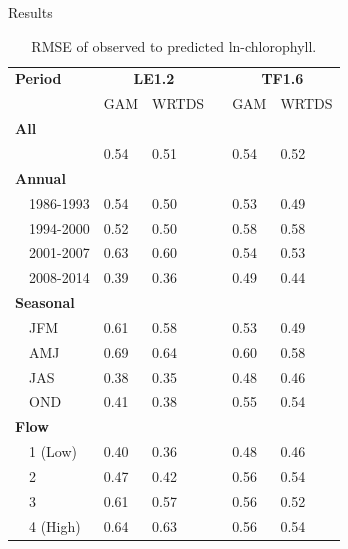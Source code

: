 \documentclass[serif]{beamer}\usepackage[]{graphicx}\usepackage[]{color}
\begin{document}
\begin{frame}[shrink]{Results}
\begin{table}[!tbp]
\caption{RMSE of observed to predicted ln-chlorophyll.\label{tab:perftoobs}} 
\begin{center}
\begin{tabular}{lllcll}
\hline\hline
\multicolumn{1}{l}{\bfseries Period}&\multicolumn{2}{c}{\bfseries LE1.2}&\multicolumn{1}{c}{\bfseries }&\multicolumn{2}{c}{\bfseries TF1.6}\tabularnewline
\cline{2-3} \cline{5-6}
\multicolumn{1}{l}{}&\multicolumn{1}{c}{GAM}&\multicolumn{1}{c}{WRTDS}&\multicolumn{1}{c}{}&\multicolumn{1}{c}{GAM}&\multicolumn{1}{c}{WRTDS}\tabularnewline
\hline
{\bfseries All}&&&&&\tabularnewline
~~&0.54&0.51&&0.54&0.52\tabularnewline
\hline
{\bfseries Annual}&&&&&\tabularnewline
~~1986-1993&0.54&0.50&&0.53&0.49\tabularnewline
~~1994-2000&0.52&0.50&&0.58&0.58\tabularnewline
~~2001-2007&0.63&0.60&&0.54&0.53\tabularnewline
~~2008-2014&0.39&0.36&&0.49&0.44\tabularnewline
\hline
{\bfseries Seasonal}&&&&&\tabularnewline
~~JFM&0.61&0.58&&0.53&0.49\tabularnewline
~~AMJ&0.69&0.64&&0.60&0.58\tabularnewline
~~JAS&0.38&0.35&&0.48&0.46\tabularnewline
~~OND&0.41&0.38&&0.55&0.54\tabularnewline
\hline
{\bfseries Flow}&&&&&\tabularnewline
~~1 (Low)&0.40&0.36&&0.48&0.46\tabularnewline
~~2&0.47&0.42&&0.56&0.54\tabularnewline
~~3&0.61&0.57&&0.56&0.52\tabularnewline
~~4 (High)&0.64&0.63&&0.56&0.54\tabularnewline
\hline
\end{tabular}\end{center}

\end{table}

\end{frame}
\end{document}
